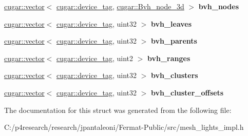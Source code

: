 \begin{DoxyCompactItemize}
\hyperlink{structcugar_1_1vector}{cugar\+::vector}$<$ \hyperlink{structcugar_1_1device__tag}{cugar\+::device\+\_\+tag}, \hyperlink{structcugar_1_1_bvh__node__3d}{cugar\+::\+Bvh\+\_\+node\+\_\+3d} $>$ {\bfseries bvh\+\_\+nodes}
\item 
\mbox{\label{struct_mesh_lights_storage_impl_a1c546fd312c450546216f488489f17b9}} 
\hyperlink{structcugar_1_1vector}{cugar\+::vector}$<$ \hyperlink{structcugar_1_1device__tag}{cugar\+::device\+\_\+tag}, uint32 $>$ {\bfseries bvh\+\_\+leaves}
\item 
\mbox{\label{struct_mesh_lights_storage_impl_aaa413c5534c103280632cd0cd8b4897f}} 
\hyperlink{structcugar_1_1vector}{cugar\+::vector}$<$ \hyperlink{structcugar_1_1device__tag}{cugar\+::device\+\_\+tag}, uint32 $>$ {\bfseries bvh\+\_\+parents}
\item 
\mbox{\label{struct_mesh_lights_storage_impl_a276b8a2b39ce937c4c3b97ca291c8be2}} 
\hyperlink{structcugar_1_1vector}{cugar\+::vector}$<$ \hyperlink{structcugar_1_1device__tag}{cugar\+::device\+\_\+tag}, uint2 $>$ {\bfseries bvh\+\_\+ranges}
\item 
\mbox{\label{struct_mesh_lights_storage_impl_ac0abb543a6bb3bbabebca6b2460520d9}} 
\hyperlink{structcugar_1_1vector}{cugar\+::vector}$<$ \hyperlink{structcugar_1_1device__tag}{cugar\+::device\+\_\+tag}, uint32 $>$ {\bfseries bvh\+\_\+clusters}
\item 
\mbox{\label{struct_mesh_lights_storage_impl_ab55f9ec8174d3e909871c8a95dee7c8e}} 
\hyperlink{structcugar_1_1vector}{cugar\+::vector}$<$ \hyperlink{structcugar_1_1device__tag}{cugar\+::device\+\_\+tag}, uint32 $>$ {\bfseries bvh\+\_\+cluster\+\_\+offsets}
\end{DoxyCompactItemize}


The documentation for this struct was generated from the following file\+:\begin{DoxyCompactItemize}
\item 
C\+:/p4research/research/jpantaleoni/\+Fermat-\/\+Public/src/mesh\+\_\+lights\+\_\+impl.\+h\end{DoxyCompactItemize}
